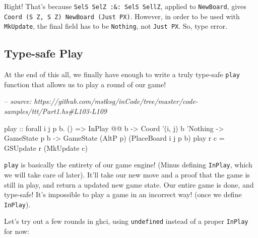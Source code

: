 \documentclass[]{article}
\newenvironment{Shaded}{}{}
\newcommand{\CommentTok}[1]{\textcolor[rgb]{0.38,0.63,0.69}{\textit{#1}}}
\newcommand{\DataTypeTok}[1]{\textcolor[rgb]{0.56,0.13,0.00}{#1}}
\newcommand{\FunctionTok}[1]{\textcolor[rgb]{0.02,0.16,0.49}{#1}}
\newcommand{\NormalTok}[1]{#1}
\newcommand{\OtherTok}[1]{\textcolor[rgb]{0.00,0.44,0.13}{#1}}
\begin{document}
Right! That's because \texttt{SelS\ SelZ\ :\&:\ SelS\ SellZ}, applied to
\texttt{NewBoard}, gives
\texttt{Coord\ \textquotesingle{}(\textquotesingle{}S\ \textquotesingle{}Z,\ \textquotesingle{}S\ \textquotesingle{}Z)\ NewBoard\ (\textquotesingle{}Just\ \textquotesingle{}PX)}.
However, in order to be used with \texttt{MkUpdate}, the final field has to be
\texttt{\textquotesingle{}Nothing}, not
\texttt{\textquotesingle{}Just\ \textquotesingle{}PX}. So, type error.

\hypertarget{type-safe-play}{%
\subsection{Type-safe Play}\label{type-safe-play}}

At the end of this all, we finally have enough to write a truly type-safe
\texttt{play} function that allows us to play a round of our game!

\begin{Shaded}
\begin{Highlighting}[]
\CommentTok{-- source: https://github.com/mstksg/inCode/tree/master/code-samples/ttt/Part1.hs#L103-L109}

\NormalTok{play}
\OtherTok{    ::}\NormalTok{ forall i j p b}\FunctionTok{.}\NormalTok{ ()}
    \OtherTok{=>} \DataTypeTok{InPlay} \FunctionTok{@@}\NormalTok{ b}
    \OtherTok{->} \DataTypeTok{Coord}\NormalTok{ '(i, j) b '}\DataTypeTok{Nothing}
    \OtherTok{->} \DataTypeTok{GameState}\NormalTok{ p b}
    \OtherTok{->} \DataTypeTok{GameState}\NormalTok{ (}\DataTypeTok{AltP}\NormalTok{ p) (}\DataTypeTok{PlaceBoard}\NormalTok{ i j p b)}
\NormalTok{play r c }\FunctionTok{=} \DataTypeTok{GSUpdate}\NormalTok{ r (}\DataTypeTok{MkUpdate}\NormalTok{ c)}
\end{Highlighting}
\end{Shaded}

\texttt{play} is basically the entirety of our game engine! (Minus defining
\texttt{InPlay}, which we will take care of later). It'll take our new move and
a proof that the game is still in play, and return a updated new game state. Our
entire game is done, and type-safe! It's impossible to play a game in an
incorrect way! (once we define \texttt{InPlay}).

Let's try out a few rounds in ghci, using \texttt{undefined} instead of a proper
\texttt{InPlay} for now:
\end{document}
